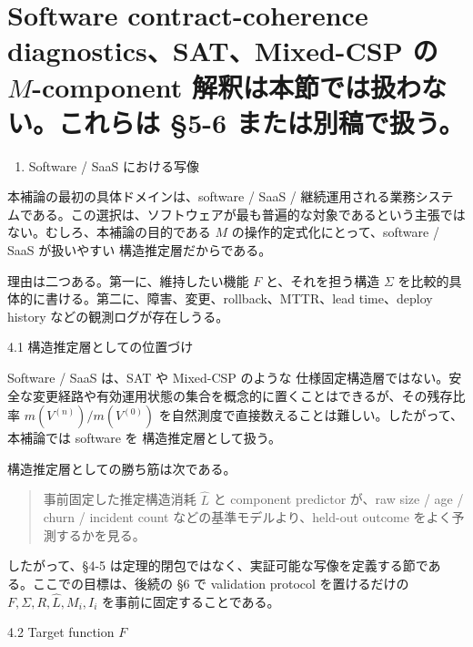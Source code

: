 \documentclass[12pt,a4paper]{article}
\begin{document}
\section{\texorpdfstring{Software contract-coherence diagnostics、SAT、Mixed-CSP の \(M\)-component 解釈は本節では扱わない。これらは §5-6 または別稿で扱う。}{Software contract-coherence diagnostics、SAT、Mixed-CSP の M-component 解釈は本節では扱わない。これらは §5-6 または別稿で扱う。}}\label{software-contract-coherence-diagnosticssatmixed-csp-ux306e-m-component-ux89e3ux91c8ux306fux672cux7bc0ux3067ux306fux6271ux308fux306aux3044ux3053ux308cux3089ux306f-5-6-ux307eux305fux306fux5225ux7a3fux3067ux6271ux3046}

\begin{enumerate}
\def\labelenumi{\arabic{enumi}.}
\setcounter{enumi}{3}
\tightlist
\item
  Software / SaaS における写像
\end{enumerate}

本補論の最初の具体ドメインは、software / SaaS / 継続運用される業務システムである。この選択は、ソフトウェアが最も普遍的な対象であるという主張ではない。むしろ、本補論の目的である \(M\) の操作的定式化にとって、software / SaaS が扱いやすい 構造推定層だからである。

理由は二つある。第一に、維持したい機能 \(F\) と、それを担う構造 \(\Sigma\) を比較的具体的に書ける。第二に、障害、変更、rollback、MTTR、lead time、deploy history などの観測ログが存在しうる。

4.1 構造推定層としての位置づけ

Software / SaaS は、SAT や Mixed-CSP のような 仕様固定構造層ではない。安全な変更経路や有効運用状態の集合を概念的に置くことはできるが、その残存比率 \(m(V^{(n)})/m(V^{(0)})\) を自然測度で直接数えることは難しい。したがって、本補論では software を 構造推定層として扱う。

構造推定層としての勝ち筋は次である。

\begin{quote}
事前固定した推定構造消耗 $\hat L$ と component predictor が、raw size / age / churn / incident count などの基準モデルより、held-out outcome をよく予測するかを見る。
\end{quote}

したがって、§4-5 は定理的閉包ではなく、実証可能な写像を定義する節である。ここでの目標は、後続の §6 で validation protocol を置けるだけの \(F,\Sigma,R,\hat L,M_i,I_i\) を事前に固定することである。

4.2 Target function \(F\)
\end{document}

